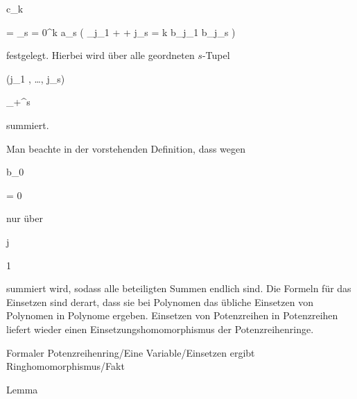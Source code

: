 {{{c_k
}

{ =} { \sum_{s = 0}^k a_s \left(  \sum_{j_1 + \cdots + j_s = k } b_{j_1 } \cdots b_{j_s}  \right)
}

{ } {
}

{ } {
}

{ } {
}

}
{}{}{}
festgelegt. Hierbei wird über alle geordneten $s$-Tupel


\mavergleichskette

{\vergleichskette

{ (j_1 , \ldots , j_s)
}

{ \in }{  \N_+^s
}

{  }{
}

{    }{
}

{   }{
}

}
{}{}{}
summiert.


}


Man beachte in der vorstehenden Definition, dass wegen


\mavergleichskette

{\vergleichskette

{b_0
}

{ = }{ 0
}

{  }{
}

{    }{
}

{   }{
}

}
{}{}{}
nur über


\mavergleichskette

{\vergleichskette

{j
}

{ \geq }{ 1
}

{  }{
}

{    }{
}

{   }{
}

}
{}{}{}
summiert wird, sodass alle beteiligten Summen endlich sind. Die Formeln für das Einsetzen sind derart, dass sie bei Polynomen das übliche Einsetzen von Polynomen in Polynome ergeben. Einsetzen von Potenzreihen in Potenzreihen liefert wieder einen Einsetzungshomomorphismus der Potenzreihenringe.



{Formaler Potenzreihenring/Eine Variable/Einsetzen ergibt Ringhomomorphismus/Fakt}

{Lemma}

{}


